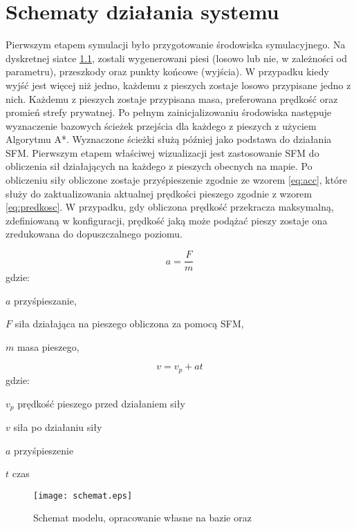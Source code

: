\chapter{Schematy działania systemu}
\label{cha:schematy}

Pierwszym etapem symulacji było przygotowanie środowiska symulacyjnego. Na dyskretnej siatce \ref{figure:siatka}, zostali wygenerowani piesi (losowo lub nie, w zależności od parametru), przeszkody oraz punkty końcowe (wyjścia). W przypadku kiedy wyjść jest więcej niż jedno, każdemu z pieszych zostaje losowo przypisane jedno z nich. Każdemu z pieszych zostaje przypisana masa, preferowana prędkość oraz promień strefy prywatnej.
Po pełnym zainicjalizowaniu środowiska następuje wyznaczenie bazowych ścieżek przejścia dla każdego z pieszych z użyciem Algorytmu A*. Wyznaczone ścieżki służą później jako podstawa do działania SFM.
Pierwszym etapem właściwej wizualizacji jest zastosowanie SFM do obliczenia sił działających na każdego z pieszych obecnych na mapie. Po obliczeniu siły obliczone zostaje przyśpieszenie zgodnie ze wzorem \ref{eq:acc}, które służy do zaktualizowania aktualnej prędkości pieszego zgodnie z wzorem \ref{eq:predkosc}. W przypadku, gdy obliczona prędkość przekracza maksymalną, zdefiniowaną w konfiguracji, prędkość jaką może podążać pieszy zostaje ona zredukowana do dopuszczalnego poziomu. 

\begin{equation}
\label{eq:acc}
a = \frac{F}{m}
\end{equation}
gdzie:
\begin{eqwhere}[2cm]
	\item[$a$] przyśpieszanie,
	\item[$F$] siła działająca na pieszego obliczona za pomocą SFM,
	\item[$m$] masa pieszego,
\end{eqwhere}

\begin{equation}
\label{eq:predkosc}
v = v_{p} + at
\end{equation}
gdzie:
\begin{eqwhere}[2cm]
	\item[$v_{p}$] prędkość pieszego przed działaniem siły
	\item[$v$] siła po działaniu siły
	\item[$a$] przyśpieszenie
	\item[$t$] czas
\end{eqwhere}

\begin{figure}
\label{figure:siatka}
\centering
\texttt{[image: schemat.eps]}
\caption{Schemat modelu, opracowanie własne na bazie \cite{6} oraz \cite{SocialForceSuwala}}
\end{figure}

